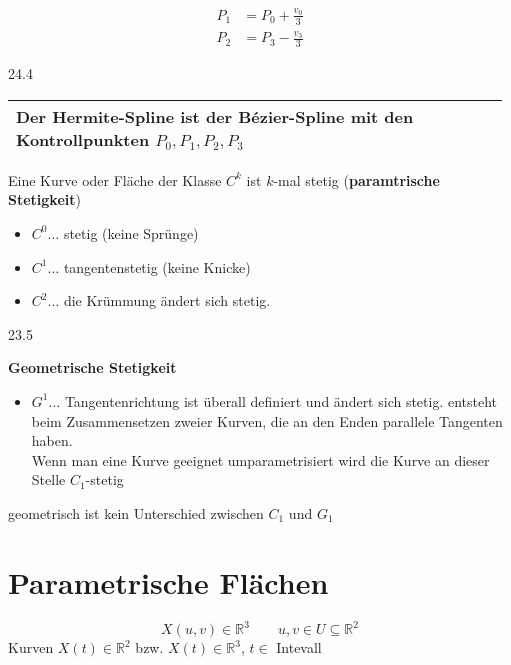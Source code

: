 \begin{align*}
 P_1 &= P_0 + \frac{v_0}{3}\\
 P_2 &= P_3 - \frac{v_3}{3}
\end{align*}
\begin{center}
 24.4
\end{center}
\begin{center}
 \begin{tabular}{|p{0.98\linewidth}|}
  \hline
  Der Hermite-Spline ist der Bézier-Spline mit den Kontrollpunkten $P_0, P_1, P_2, P_3$\\
  \hline
 \end{tabular}
\end{center}

\Satz Eine Kurve oder Fläche der Klasse $C^k$ ist $k$-mal stetig (\textbf{paramtrische Stetigkeit})
	\begin{itemize}
	 \item $C^0 \dots$ stetig (keine Sprünge)
	 \item $C^1 \dots$ tangentenstetig (keine Knicke)
	 \item $C^2 \dots$ die Krümmung ändert sich stetig.
	\end{itemize}
\begin{center}
 23.5
\end{center}
\Defi \textbf{Geometrische Stetigkeit}
\begin{itemize}
 \item $G^1 \dots$ Tangentenrichtung ist überall definiert und ändert sich stetig.
	entsteht beim Zusammensetzen zweier Kurven, die an den Enden parallele Tangenten haben.\\
	Wenn man eine Kurve geeignet umparametrisiert wird die Kurve an dieser Stelle $C_1$-stetig
\end{itemize}
geometrisch ist kein Unterschied zwischen $C_1$ und $G_1$

\section{Parametrische Flächen}
\[X(u,v) \in \mathbb{R}^3 \qquad u, v \in U \subseteq \mathbb{R}^2\]
Kurven $X(t) \in \mathbb{R}^2$ bzw. $X(t) \in \mathbb{R}^3$, $t \in$ Intevall
